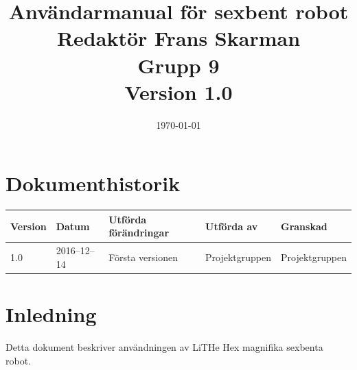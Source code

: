 \documentclass[a4paper,titlepage,12pt]{article}
\begin{document}
	\title{\LARGE
		\textbf{Användarmanual för sexbent robot} \\
		\vspace*{0.5\baselineskip}
		\large
		Redaktör Frans Skarman \\
		Grupp 9 \\
		\small
		\vspace*{0.5\baselineskip}
		Version 1.0}

	\date{\today}

	\maketitle
	
	\newpage

	\tableofcontents
	\newpage



	\section*{Dokumenthistorik}
	\renewcommand*{\arraystretch}{1.4}
    \begin{longtable}[c]{ l l >{\raggedright}p{5cm} >{\raggedright}p{3cm} l }
		\textbf{Version} & \textbf{Datum} & \textbf{Utförda förändringar} 
		& \textbf{Utförda av} & \textbf{Granskad} \\ \midrule
		
	    1.0 & 2016--12--14 & Första versionen & Projektgruppen &
        Projektgruppen \\
            
	\end{longtable}


	\newpage

	\raggedright

	\section{Inledning}
	Detta dokument beskriver användningen av LiTHe Hex magnifika sexbenta robot.

	
\end{document}
